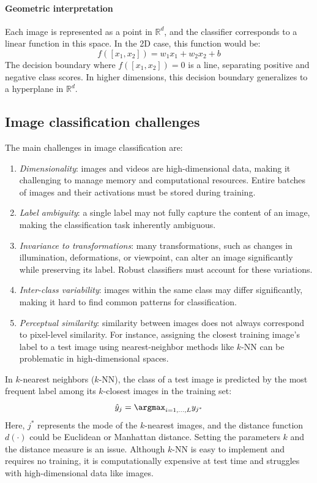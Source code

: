\paragraph*{Geometric interpretation}
Each image is represented as a point in $\mathbb{R}^d$, and the classifier corresponds to a linear function in this space. 
In the 2D case, this function would be:
\[f([x_1,x_2])=w_1x_1+w_2x_2+b\]
The decision boundary where $f([x_1,x_2])=0$ is a line, separating positive and negative class scores.
In higher dimensions, this decision boundary generalizes to a hyperplane in $\mathbb{R}^d$. 

\subsection{Image classification challenges}
The main challenges in image classification are: 
\begin{enumerate}
    \item \textit{Dimensionality}: images and videos are high-dimensional data, making it challenging to manage memory and computational resources. 
        Entire batches of images and their activations must be stored during training.
    \item \textit{Label ambiguity}: a single label may not fully capture the content of an image, making the classification task inherently ambiguous.
    \item \textit{Invariance to transformations}: many transformations, such as changes in illumination, deformations, or viewpoint, can alter an image significantly while preserving its label. 
        Robust classifiers must account for these variations.
    \item \textit{Inter-class variability}: images within the same class may differ significantly, making it hard to find common patterns for classification.
    \item \textit{Perceptual similarity}: similarity between images does not always correspond to pixel-level similarity. 
        For instance, assigning the closest training image's label to a test image using nearest-neighbor methods like $k$-NN can be problematic in high-dimensional spaces.
\end{enumerate}
In $k$-nearest neighbors ($k$-NN), the class of a test image is predicted by the most frequent label among its $k$-closest images in the training set:
\[\hat{y}_j=\argmax_{i=1,\dots,L}y_{j^\ast}\]
Here, $j^\ast$ represents the mode of the $k$-nearest images, and the distance function $d(\cdot)$ could be Euclidean or Manhattan distance.
Setting the parameters $k$ and the distance measure is an issue. 
Although $k$-NN is easy to implement and requires no training, it is computationally expensive at test time and struggles with high-dimensional data like images.

